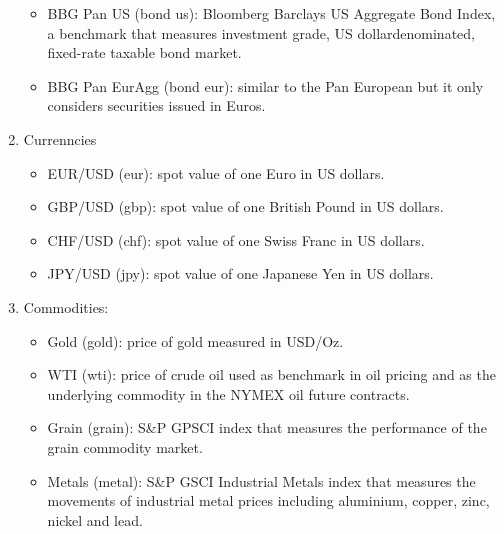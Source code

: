 \begin{enumerate}
\begin{itemize}
        \item BBG Pan US (bond us): Bloomberg Barclays US Aggregate Bond Index, a benchmark that measures investment grade, US dollardenominated, fixed-rate taxable bond market.
        \item BBG Pan EurAgg (bond eur): similar to the Pan European but it only considers securities issued in Euros.
    \end{itemize}
    \item Currenncies
    \begin{itemize}
        \item EUR/USD (eur): spot value of one Euro in US dollars.
        \item GBP/USD (gbp): spot value of one British Pound in US dollars.
        \item CHF/USD (chf): spot value of one Swiss Franc in US dollars.
        \item JPY/USD (jpy): spot value of one Japanese Yen in US dollars.
    \end{itemize}
    \item Commodities:
    \begin{itemize}
        \item Gold (gold): price of gold measured in USD/Oz.
        \item WTI (wti): price of crude oil used as benchmark in oil pricing and as the underlying commodity in the NYMEX oil future contracts.
        \item Grain (grain): S\&P GPSCI index that measures the performance of the grain commodity market.
        \item Metals (metal): S\&P GSCI Industrial Metals index that measures the movements of industrial metal prices including aluminium, copper, zinc, nickel and lead.
    \end{itemize}
\end{enumerate}

